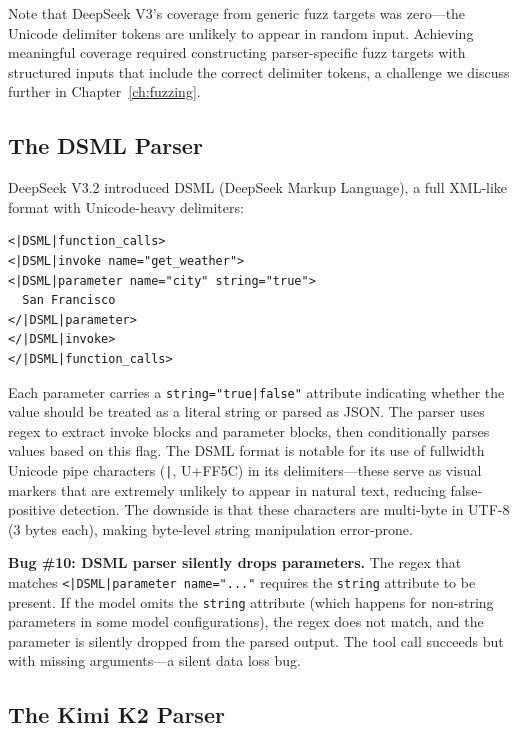 Note that DeepSeek V3's coverage from generic fuzz targets was zero---the Unicode delimiter tokens are unlikely to appear in random input. Achieving meaningful coverage required constructing parser-specific fuzz targets with structured inputs that include the correct delimiter tokens, a challenge we discuss further in Chapter~\ref{ch:fuzzing}.

\subsection{The DSML Parser}

DeepSeek V3.2 introduced DSML (DeepSeek Markup Language), a full XML-like format with Unicode-heavy delimiters:

\begin{verbatim}
<|DSML|function_calls>
<|DSML|invoke name="get_weather">
<|DSML|parameter name="city" string="true">
  San Francisco
</|DSML|parameter>
</|DSML|invoke>
</|DSML|function_calls>
\end{verbatim}

Each parameter carries a \texttt{string="true|false"} attribute indicating whether the value should be treated as a literal string or parsed as JSON. The parser uses regex to extract invoke blocks and parameter blocks, then conditionally parses values based on this flag. The DSML format is notable for its use of fullwidth Unicode pipe characters (\texttt{|}, U+FF5C) in its delimiters---these serve as visual markers that are extremely unlikely to appear in natural text, reducing false-positive detection. The downside is that these characters are multi-byte in UTF-8 (3 bytes each), making byte-level string manipulation error-prone.

\begin{bugbox}
\textbf{Bug \#10: DSML parser silently drops parameters.} The regex that matches \texttt{<|DSML|parameter name="..."} requires the \texttt{string} attribute to be present. If the model omits the \texttt{string} attribute (which happens for non-string parameters in some model configurations), the regex does not match, and the parameter is silently dropped from the parsed output. The tool call succeeds but with missing arguments---a silent data loss bug.
\end{bugbox}

\subsection{The Kimi K2 Parser}

